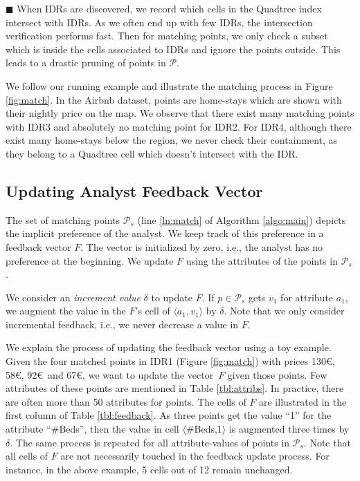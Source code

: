 \documentclass[sigconf,edbt]{acmart-edbt2019}
\begin{document}
\vspace{2pt}
\noindent $\blacksquare$ When IDRs are discovered, we record which cells in the Quadtree index intersect with IDRs. As we often end up with few IDRs, the intersection verification performs fast. Then for matching points, we only check a subset which is inside the cells associated to IDRs and ignore the points outside. This leads to a drastic pruning of points in $\mathcal{P}$.

\vspace{4pt}
We follow our running example and illustrate the matching process in Figure \ref{fig:match}. In the \textsf{Airbnb} dataset, points are home-stays which are shown with their nightly price on the map. We observe that there exist many matching points with IDR3 and absolutely no matching point for IDR2. For IDR4, although there exist many home-stays below the region, we never check their containment, as they belong to a Quadtree cell which doesn't intersect with the IDR. 

\subsection{Updating Analyst Feedback Vector}
The set of matching points $\mathcal{P}_s$ (line \ref{ln:match} of Algorithm \ref{algo:main}) depicts the implicit preference of the analyst. We keep track of this preference in a feedback vector $F$. The vector is initialized by zero, i.e., the analyst has no preference at the beginning. We update $F$ using the attributes of the points in $\mathcal{P}_s$.

\vspace{2pt}
We consider an {\em increment value} $\delta$ to update $F$. If $p \in \mathcal{P}_s$ gets $v_1$ for attribute $a_1$, we augment the value in the $F$'s cell of $\langle a_1, v_1 \rangle$ by $\delta$. Note that we only consider incremental feedback, i.e., we never decrease a value in $F$.

\vspace{2pt}
We explain the process of updating the feedback vector using a toy example. Given the four matched points in IDR1 (Figure \ref{fig:match}) with prices 130\euro, 58\euro, 92\euro\ and 67\euro, we want to update the vector~$F$ given those points. Few attributes of these points are mentioned in Table \ref{tbl:attribs}. In practice, there are often more than 50 attributes for points. The cells of $F$ are illustrated in the first column of Table \ref{tbl:feedback}. As three points get the value ``1'' for the attribute ``\#Beds'', then the value in cell $\langle$\#Beds,1$\rangle$ is augmented three times by $\delta$. The same process is repeated for all attribute-values of points in $\mathcal{P}_s$. Note that all cells of $F$ are not necessarily touched in the feedback update process. For instance, in the above example, 5 cells out of 12 remain unchanged.
\end{document}
